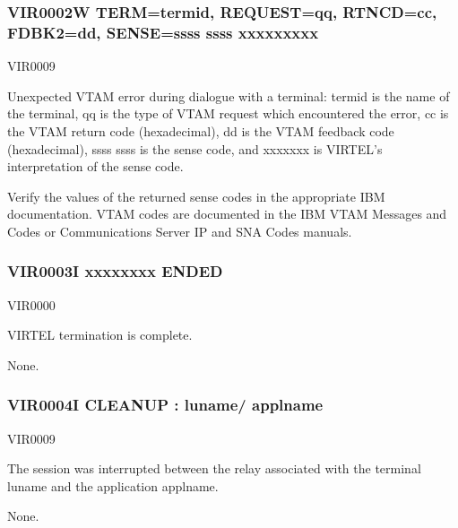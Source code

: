 \documentclass[letterpaper,10pt,english]{sphinxmanual}
\begin{document}
\subsubsection{VIR0002W TERM=termid, REQUEST=qq, RTNCD=cc, FDBK2=dd, SENSE=ssss ssss xxxxxxxxx}
\label{\detokenize{messages:vir0002w-term-termid-request-qq-rtncd-cc-fdbk2-dd-sense-ssss-ssss-xxxxxxxxx}}\begin{description}
\sphinxAtStartPar
VIR0009

\sphinxAtStartPar
Unexpected VTAM error during dialogue with a terminal: termid is the name of the terminal, qq is the type of VTAM request which encountered the error, cc is the VTAM return code (hexadecimal), dd is the VTAM feedback code (hexadecimal), ssss ssss is the sense code, and xxxxxxx is VIRTEL’s interpretation of the sense code.

\sphinxAtStartPar
Verify the values of the returned sense codes in the appropriate IBM documentation. VTAM codes are documented in the IBM VTAM Messages and Codes or Communications Server IP and SNA Codes manuals.

\end{description}


\subsubsection{VIR0003I xxxxxxxx ENDED}
\label{\detokenize{messages:vir0003i-xxxxxxxx-ended}}\begin{description}
\sphinxAtStartPar
VIR0000

\sphinxAtStartPar
VIRTEL termination is complete.

\sphinxAtStartPar
None.

\end{description}


\subsubsection{VIR0004I CLEANUP : luname/ applname}
\label{\detokenize{messages:vir0004i-cleanup-luname-applname}}\begin{description}
\sphinxAtStartPar
VIR0009

\sphinxAtStartPar
The session was interrupted between the relay associated with the terminal luname and the application applname.

\sphinxAtStartPar
None.

\end{description}
\end{document}
